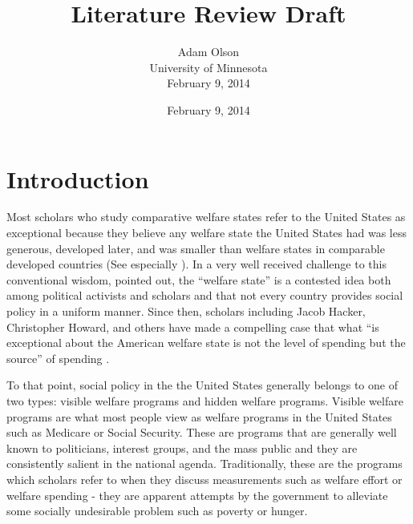\documentclass[12pt]{article}
\author{Adam Olson\\University of Minnesota\\February 9, 2014}
\title{Literature Review Draft}
\date{February 9, 2014}
\makeatletter
\renewcommand{\maketitle}{\bgroup\setlength{\parindent}{0pt}
\begin{flushleft}
  \textbf{\@title}

  \@author
\end{flushleft}\egroup
}
\makeatother
\begin{document}
\maketitle

\section{Introduction}
Most scholars who study comparative welfare states refer to the United States as exceptional because they believe any welfare state the United States had was less generous, developed later, and was smaller than welfare states in comparable developed countries (See especially \citealt{andersen1990}). In a very well received challenge to this conventional wisdom, \citet{hacker2002} pointed out, the ``welfare state'' is a contested idea both among political activists and scholars and that not every country provides social policy in a uniform manner. Since then, scholars including Jacob Hacker, Christopher Howard, and others have made a compelling case that what ``is exceptional about the American welfare state is not the level of spending but the source'' of spending \citep[pg. 7]{hacker2002}.

To that point, social policy in the the United States generally belongs to one of two types: visible welfare programs and hidden welfare programs. Visible welfare programs are what most people view as welfare programs in the United States such as Medicare or Social Security. These are programs that are generally well known to politicians, interest groups, and the mass public and they are consistently salient in the national agenda. Traditionally, these are the programs which scholars refer to when they discuss measurements such as welfare effort or welfare spending - they are apparent attempts by the government to alleviate some socially undesirable problem such as poverty or hunger.
\end{document}

